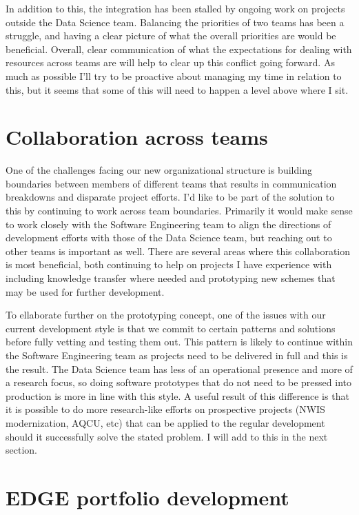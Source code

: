 \documentclass{article}
\begin{document}
In addition to this, the integration has been stalled by ongoing work on projects outside the Data Science team.
Balancing the priorities of two teams has been a struggle, and having a clear picture of what the overall priorities are would be beneficial.
Overall, clear communication of what the expectations for dealing with resources across teams are will help to clear up this conflict going forward.
As much as possible I'll try to be proactive about managing my time in relation to this, but it seems that some of this will need to happen a level above where I sit.

\section{Collaboration across teams}

One of the challenges facing our new organizational structure is building boundaries between members of different teams that results in communication breakdowns and disparate project efforts.
I'd like to be part of the solution to this by continuing to work across team boundaries.
Primarily it would make sense to work closely with the Software Engineering team to align the directions of development efforts with those of the Data Science team, but reaching out to other teams is important as well.
There are several areas where this collaboration is most beneficial, both continuing to help on projects I have experience with including knowledge transfer where needed and prototyping new schemes that may be used for further development.

To ellaborate further on the prototyping concept, one of the issues with our current development style is that we commit to certain patterns and solutions before fully vetting and testing them out.
This pattern is likely to continue within the Software Engineering team as projects need to be delivered in full and this is the result.
The Data Science team has less of an operational presence and more of a research focus, so doing software prototypes that do not need to be pressed into production is more in line with this style.
A useful result of this difference is that it is possible to do more research-like efforts on prospective projects (NWIS modernization, AQCU, etc) that can be applied to the regular development should it successfully solve the stated problem.
I will add to this in the next section.

\section{EDGE portfolio development}
\end{document}

